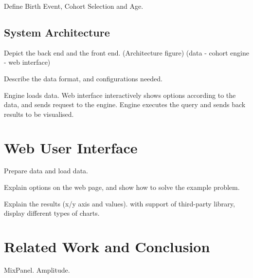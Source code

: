\documentclass[10pt,conference,letterpaper]{IEEEtran}
\begin{document}
Define Birth Event, Cohort Selection and Age.

\subsection{System Architecture}

Depict the back end and the front end. (Architecture figure) (data - cohort engine - web interface)

Describe the data format, and configurations needed.

Engine loads data. Web interface interactively shows options according to the data, and sends request to the engine. Engine executes the query and sends back results to be visualised.

\section{Web User Interface}

Prepare data and load data.

Explain options on the web page, and show how to solve the example problem.

Explain the results (x/y axis and values). with support of third-party library, display different types of charts.

\section{Related Work and Conclusion}

MixPanel. Amplitude. 







\end{document}
